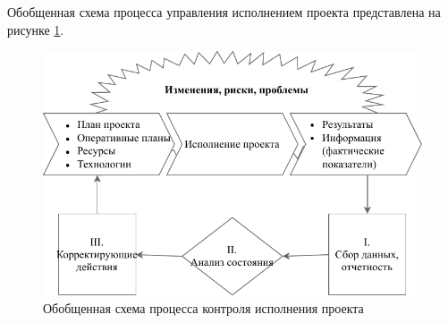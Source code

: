 Обобщенная схема процесса управления исполнением проекта представлена на рисунке \ref{fig:ris7}.
\begin{figure}[!h]
	\centering
	\includegraphics[width=\linewidth]{control}
	\caption{Обобщенная схема процесса контроля исполнения проекта}
	\label{fig:ris7}
\end{figure}
